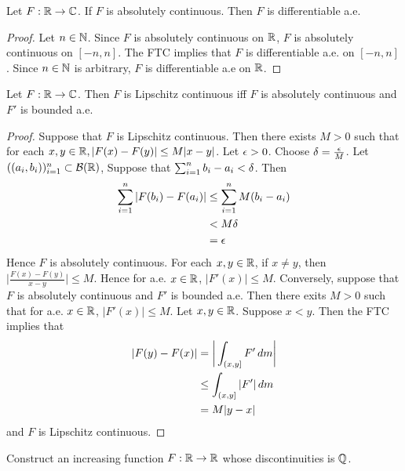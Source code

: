 \documentclass{book}
\begin{document}
	\begin{ex}  
		Let $F: \mathbb{R} \rightarrow \mathbb{C}$. If $F$ is absolutely continuous. Then $F$ is differentiable a.e.
	\end{ex}
	
	\begin{proof}
		Let $n \in \mathbb{N}$. Since $F$ is absolutely continuous on $\mathbb{R}$, $F$ is absolutely continuous on $[-n,n]$. The FTC implies that $F$ is differentiable a.e. on $[-n,n]$. Since $n \in \mathbb{N}$ is arbitrary, $F$ is differentiable a.e on $\mathbb{R}$.
	\end{proof}
	
	\begin{ex}  
		Let $F: \mathbb{R} \rightarrow \mathbb{C}$. Then $F$ is Lipschitz continuous iff $F$ is absolutely continuous and $F'$ is bounded a.e.
	\end{ex}
	
	\begin{proof}
		Suppose that $F$ is Lipschitz continuous. Then there exists $M>0$ such that for each $x,y \in \mathbb{R}, |F(x)-F(y)| \leq M|x-y|$. Let $\epsilon >0$. Choose $\delta = \frac{\epsilon}{M}$. Let $((a_i, b_i))_{i=1}^n \subset \mathcal{B}(\mathbb{R})$, Suppose that $\sum_{i=1}^n b_i-a_i < \delta$. Then 
		\begin{align*}
			\sum_{i=1}^n|F(b_i)-F(a_i)| 
			&\leq \sum_{i=1}^n M(b_i - a_i)\\
			&< M\delta\\
			&= \epsilon
		\end{align*}
		Hence $F$ is absolutely continuous. For each $x, y \in \mathbb{R}$, if $x \neq y$, then $\bigg|\frac{F(x)-F(y)}{x-y}\bigg| \leq M$. Hence for a.e. $x \in \mathbb{R}$, $|F'(x)| \leq M$. Conversely, suppose that $F$ is absolutely continuous and $F'$ is bounded a.e. Then there exits $M> 0$ such that for a.e. $x \in \mathbb{R}$, $|F'(x)| \leq M$. Let $x,y \in \mathbb{R}$. Suppose $x<y$. Then the FTC implies that 
		\begin{align*}
			|F(y)-F(x)|
			& = \bigg|\int_{(x,y]}F'\, d m\bigg|\\
			&\leq \int_{(x,y]}|F'|\, d m\\
			&=M|y-x|
		\end{align*}
		and $F$ is Lipschitz continuous.
	\end{proof}
	
	\begin{ex}  
		Construct an increasing function $F: \mathbb{R} \rightarrow \mathbb{R}$ whose discontinuities is $\mathbb{Q}$.
	\end{ex}
	
\end{document}
